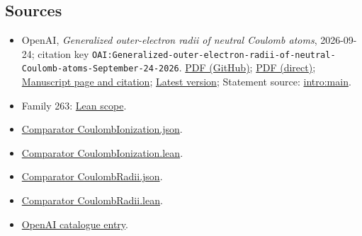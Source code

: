\documentclass[11pt]{article}
\begin{document}
\subsection{Sources}
\begin{itemize}
\item OpenAI, \emph{Generalized outer-electron radii of neutral Coulomb atoms}, 2026-09-24; citation key \texttt{OAI:Generalized-outer-electron-radii-of-neutral-Coulomb-atoms-September-24-2026}. \href{https://github.com/openai/math/blob/adc7f1241b42e322a6451854ab7e4b4c146bf78a/preprints/Generalized-outer-electron-radii-of-neutral-Coulomb-atoms-September-24-2026/paper.pdf}{PDF (GitHub)}; \href{https://github.com/openai/math/raw/adc7f1241b42e322a6451854ab7e4b4c146bf78a/preprints/Generalized-outer-electron-radii-of-neutral-Coulomb-atoms-September-24-2026/paper.pdf}{PDF (direct)}; \href{https://github.com/openai/math/blob/adc7f1241b42e322a6451854ab7e4b4c146bf78a/preprints/Generalized-outer-electron-radii-of-neutral-Coulomb-atoms-September-24-2026/README.md}{Manuscript page and citation}; \href{https://github.com/openai/math/blob/main/preprints/Generalized-outer-electron-radii-of-neutral-Coulomb-atoms-September-24-2026/paper.pdf}{Latest version}; Statement source: \href{https://github.com/openai/math/blob/adc7f1241b42e322a6451854ab7e4b4c146bf78a/preprints/Generalized-outer-electron-radii-of-neutral-Coulomb-atoms-September-24-2026/build/sections/01-introduction.tex\#L38}{intro:main}.
\item Family 263: \href{https://github.com/openai/math/blob/adc7f1241b42e322a6451854ab7e4b4c146bf78a/lean/docs/263.md}{Lean scope}.
\item \href{https://github.com/openai/math/blob/adc7f1241b42e322a6451854ab7e4b4c146bf78a/lean/ComparatorChallenges/CoulombIonization.json}{Comparator CoulombIonization.json}.
\item \href{https://github.com/openai/math/blob/adc7f1241b42e322a6451854ab7e4b4c146bf78a/lean/ComparatorChallenges/CoulombIonization.lean}{Comparator CoulombIonization.lean}.
\item \href{https://github.com/openai/math/blob/adc7f1241b42e322a6451854ab7e4b4c146bf78a/lean/ComparatorChallenges/CoulombRadii.json}{Comparator CoulombRadii.json}.
\item \href{https://github.com/openai/math/blob/adc7f1241b42e322a6451854ab7e4b4c146bf78a/lean/ComparatorChallenges/CoulombRadii.lean}{Comparator CoulombRadii.lean}.
\item \href{https://github.com/openai/math/blob/adc7f1241b42e322a6451854ab7e4b4c146bf78a/CONTENTS.md}{OpenAI catalogue entry}.
\end{itemize}
\end{document}
